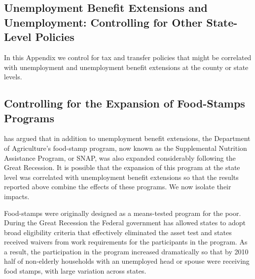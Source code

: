 \documentclass[12pt]{article}
\newcommand{\1}{\mathbf{1}}
\begin{document}
\begin{appendix}
\begin{table}[H]
  \centering
   \caption{Unemployment Benefit Extensions and Job Creation: QWI Separations}\label{tab:macroeffects_beg}
   
\small

\vspace{-0.2cm}
\end{table}

\FloatBarrier

\section{Unemployment Benefit Extensions and Unemployment: Controlling for Other State-Level Policies}
\label{app:benefits_and_unemployment_state_policies}

In this Appendix we control for tax and transfer policies that might be correlated with unemployment and unemployment benefit extensions at the county or state levels.


\subsection{Controlling for the Expansion of Food-Stamps Programs}


\citet{mulligan:12} has argued that in addition to unemployment benefit extensions, the Department of Agriculture's food-stamp program, now known as the Supplemental Nutrition Assistance Program, or SNAP, was also expanded considerably following the Great Recession. It is possible that the expansion of this program at the state level was correlated with unemployment benefit extensions so that the results reported above combine the effects of these programs. We now isolate their impacts.

Food-stamps were originally designed as a means-tested program for the poor. During the Great Recession the Federal government has allowed states to adopt  broad eligibility criteria that effectively eliminated the asset test and states received waivers from work requirements for the participants in the program. As a result, the participation in the program increased dramatically so that by 2010 half of non-elderly households with an unemployed head or spouse were receiving food stamps, with large variation across states.


\end{appendix}
\end{document}
